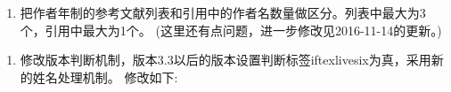 \begin{enumerate}
\item 把作者年制的参考文献列表和引用中的作者名数量做区分。列表中最大为3个，引用中最大为1个。
(这里还有点问题，进一步修改见2016-11-14的更新。)
\begin{texlist}
%
\end{texlist}
\end{enumerate}

\begin{enumerate}
\item 修改版本判断机制，版本3.3以后的版本设置判断标签iftexlivesix为真，采用新的姓名处理机制。
修改如下:
\end{enumerate}

